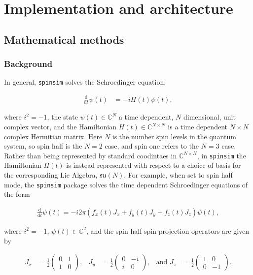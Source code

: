 \documentclass{jors}
\begin{document}
\section*{Implementation and architecture}
	\subsection*{Mathematical methods}
		\subsubsection*{Background}
			In general, \texttt{spinsim} solves the Schroedinger equation,

			\begin{align*}
				\frac{\mathrm{d}}{\mathrm{d}t}\psi(t) &= -iH(t)\psi(t),
			\end{align*}

			where \(i^2 = -1\), the state \(\psi(t) \in \mathbb{C}^N\) a time dependent, \(N\) dimensional, unit complex vector, and the Hamiltonian \(H(t) \in \mathbb{C}^{N \times N}\) is a time dependent \(N \times N\) complex Hermitian matrix. Here \(N\) is the number spin levels in the quantum system, so spin half is the \(N = 2\) case, and spin one refers to the \(N = 3\) case. Rather than being represented by standard coodintaes in \(\mathbb{C}^{N \times N}\), in \texttt{spinsim} the Hamiltonian \(H(t)\) is instead represented with respect to a choice of basis for the corresponding Lie Algebra, \(\mathfrak{su}(N)\). For example, when set to spin half mode, the \texttt{spinsim} package solves the time dependent Schroedinger equations of the form

			\begin{align*}
				\frac{\mathrm{d}}{\mathrm{d}t}\psi(t) = -i 2\pi (f_x(t) J_x + f_y(t) J_y + f_z(t) J_z) \psi(t),
			\end{align*}

			where \(i^2 = -1\), \(\psi(t) \in \mathbb{C}^2\), and the spin half spin projection operators are given by

			\begin{align*}
				J_x &= \frac12\begin{pmatrix}
					0 & 1 \\
					1 & 0
				\end{pmatrix},
				&J_y &= \frac12\begin{pmatrix}
					0 & -i \\
					i &  0
				\end{pmatrix},
				&\textrm{and }J_z &= \frac12\begin{pmatrix}
					1 &  0 \\
					0 & -1
				\end{pmatrix}.
			\end{align*}
\end{document}
